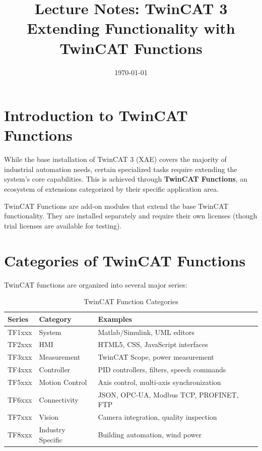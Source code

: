 \documentclass[11pt,a4paper]{article}
\title{
    \vspace{-1cm}
    \textbf{Lecture Notes: TwinCAT 3}\\
    \Large Extending Functionality with TwinCAT Functions
}
\author{}
\date{\today}
\begin{document}
\maketitle

\tableofcontents
\newpage

\section{Introduction to TwinCAT Functions}

While the base installation of TwinCAT 3 (XAE) covers the majority of industrial automation needs, certain specialized tasks require extending the system's core capabilities. This is achieved through \textbf{TwinCAT Functions}, an ecosystem of extensions categorized by their specific application area.

\begin{notebox}
TwinCAT Functions are add-on modules that extend the base TwinCAT functionality. They are installed separately and require their own licenses (though trial licenses are available for testing).
\end{notebox}

\section{Categories of TwinCAT Functions}

TwinCAT functions are organized into several major series:

\begin{table}[h]
\centering
\begin{tabular}{@{}lll@{}}
\toprule
\textbf{Series} & \textbf{Category} & \textbf{Examples} \\
\midrule
TF1xxx & System & Matlab/Simulink, UML editors \\
TF2xxx & HMI & HTML5, CSS, JavaScript interfaces \\
TF3xxx & Measurement & TwinCAT Scope, power measurement \\
TF4xxx & Controller & PID controllers, filters, speech commands \\
TF5xxx & Motion Control & Axis control, multi-axis synchronization \\
TF6xxx & Connectivity & JSON, OPC-UA, Modbus TCP, PROFINET, FTP \\
TF7xxx & Vision & Camera integration, quality inspection \\
TF8xxx & Industry Specific & Building automation, wind power \\
\bottomrule
\end{tabular}
\caption{TwinCAT Function Categories}
\end{table}
\end{document}
